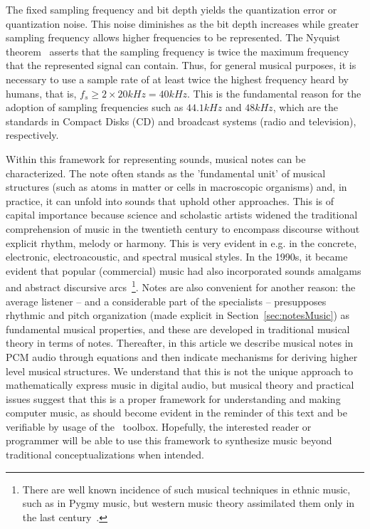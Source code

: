 The fixed sampling frequency and bit depth
yields the quantization error or quantization noise.
This noise diminishes as the bit depth increases
while greater sampling frequency allows higher frequencies to be represented.
The Nyquist theorem~\cite{Openheim} asserts that the sampling frequency
is twice the maximum frequency that the represented signal can contain.
Thus, for general musical purposes, it is necessary to use a sample rate of
at least twice the highest frequency heard by humans,
that is, $f_s \geq 2\times 20kHz = 40kHz$.
This is the fundamental reason for the adoption of sampling frequencies
such as $44.1kHz$ and $48kHz$,
which are the standards in Compact Disks (CD)
and broadcast systems (radio and television), respectively.

Within this framework for representing sounds,
musical notes can be characterized.
The note often stands as the 'fundamental unit' of musical structures
(such as atoms in matter or cells in macroscopic organisms) and,
in practice, it can unfold into sounds that uphold other approaches.
This is of capital importance because science and scholastic artists
widened the traditional comprehension of music in the twentieth century
to encompass discourse without explicit rhythm, melody or harmony.
This is very evident in e.g. in the concrete, electronic, electroacoustic,
and spectral musical styles.
In the 1990s, it became evident that popular
(commercial) music had also incorporated
sounds amalgams and abstract discursive arcs~\footnote{There
are well known incidence of such musical techniques in ethnic music,
such as in Pygmy music, but western music theory assimilated them
only in the last century~\cite{Wisnik}.}.
Notes are also convenient for another reason:
the average listener -- and a considerable part of the specialists --
presupposes rhythmic and pitch organization 
(made explicit in Section~\ref{sec:notesMusic})
as fundamental musical properties,
and these are developed in traditional musical theory in terms of notes.
Thereafter, in this article we describe musical notes in PCM audio through equations
and then indicate mechanisms for deriving higher level musical structures.
We understand that this is not the unique approach to mathematically express music in
digital audio, but musical theory and practical issues suggest that
this is a proper framework for understanding and making computer music,
as should become evident in the reminder of this text and be verifiable
by usage of the \massa\ toolbox.
Hopefully, the interested reader or programmer will be able to use
this framework to synthesize music beyond traditional conceptualizations when intended.

